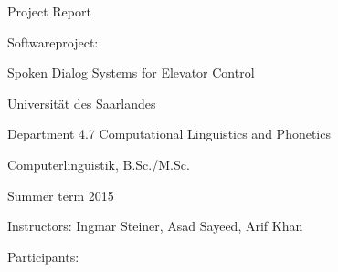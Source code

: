 
\begin{center} Project Report \end{center}
\hspace{1cm}
\begin{center} Softwareproject: \end{center}
\begin{center}Spoken Dialog Systems for Elevator Control \end{center}
\begin{center} Universität des Saarlandes \end{center}
\begin{center} Department 4.7 Computational Linguistics and Phonetics \end{center}
\begin{center} Computerlinguistik, B.Sc./M.Sc. \end{center}
\begin{center} Summer term 2015 \end{center} 

\hspace{1cm}
\begin{center}Instructors: Ingmar Steiner, Asad Sayeed, Arif Khan \end{center}

\begin{center} Participants: \end{center} 

